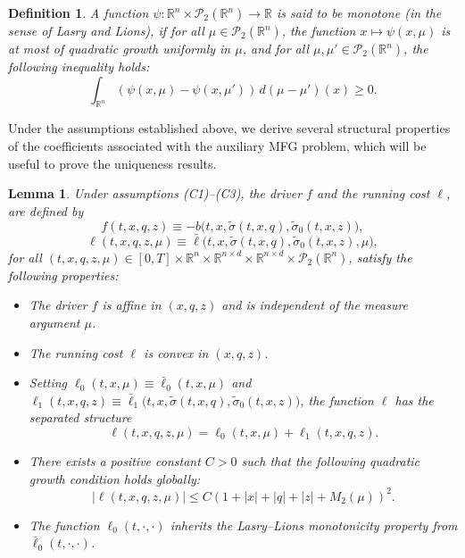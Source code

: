 \documentclass[11pt,a4paper]{article}
\newtheorem{lemma}[theo]{Lemma}
\newtheorem{defi}[theo]{Definition}
\begin{document}
\begin{defi}
\label{monotone}
    A function $\psi: \mathbb{R}^n \times \mathcal{P}_2(\mathbb{R}^n) \to \mathbb R$
is said to be \emph{monotone} (in the sense of Lasry and Lions), if for all \( \mu \in \mathcal{P}_2(\mathbb{R}^n) \), the function   \( x \mapsto \psi (x, \mu) \) is at most of quadratic growth uniformly in $\mu$,  and for all \( \mu, \mu' \in \mathcal{P}_2(\mathbb{R}^n) \), the following inequality holds:
    \[
    \int_{\mathbb{R}^n} \left( \psi(x, \mu) - \psi(x, \mu') \right) \, d(\mu - \mu')(x) \geq 0.
    \]
\end{defi}

Under the assumptions established above, we  derive several structural  properties of the coefficients associated with the auxiliary MFG problem, which will be useful to prove the uniqueness results.
\begin{lemma}
\label{assumC}
Under assumptions \textnormal{(C1)--(C3)}, the  driver $f$ and the  running cost $\ell$, are defined by
\[
f(t,x,q,z) \equiv -b\big(t, x, \tilde{\sigma}(t, x, q), \tilde{\sigma}_0(t, x, z)\big),
\]
\[
\ell(t, x, q, z, \mu) \equiv \bar{\ell}\big(t, x, \tilde{\sigma}(t, x, q), \tilde{\sigma}_0(t, x, z), \mu\big),
\]
for all $(t,x,q,z,\mu) \in [0,T] \times \mathbb{R}^n \times \mathbb{R}^{n\times d} \times \mathbb{R}^{n\times d} \times \mathcal{P}_2(\mathbb{R}^n)$, satisfy the following properties:
\begin{itemize}
    \item[\rm (i)] The driver $f$ is affine in $(x, q, z)$ and is independent of the measure argument $\mu$.
    \item[\rm (ii)] The running cost $\ell$ is  convex in $(x, q, z)$.
    \item[\rm (iii)] Setting $\ell_0(t,x,\mu) \equiv \bar{\ell}_0(t,x,\mu)$ and $\ell_1(t,x,q,z) \equiv \bar{\ell}_1\big(t, x, \tilde{\sigma}(t, x, q), \tilde{\sigma}_0(t, x, z)\big)$, the function $\ell$ has the separated structure
    \[ \ell(t, x, q, z, \mu) = \ell_0(t, x, \mu) + \ell_1(t, x, q, z). \]
    \item[\rm (iv)] There exists a positive constant $C > 0$ such that the following quadratic growth condition holds globally:
    \[ |\ell(t, x, q, z, \mu)| \leq C \left( 1 + |x| + |q| + |z| + M_2(\mu) \right)^2. \]
    \item[\rm (v)] The function $\ell_0(t, \cdot, \cdot)$ inherits the Lasry--Lions monotonicity property from $\bar{\ell}_0(t, \cdot, \cdot)$.
\end{itemize}
\end{lemma}
\end{document}
